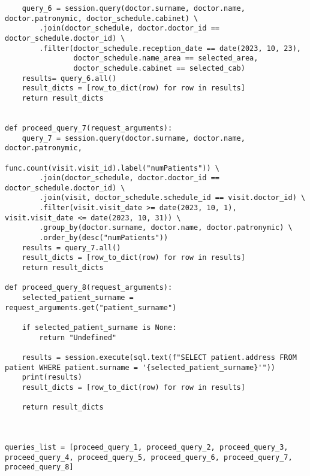 \documentclass{article}
\begin{document}
{\begin{verbatim}
    query_6 = session.query(doctor.surname, doctor.name, doctor.patronymic, doctor_schedule.cabinet) \
        .join(doctor_schedule, doctor.doctor_id == doctor_schedule.doctor_id) \
        .filter(doctor_schedule.reception_date == date(2023, 10, 23),
                doctor_schedule.name_area == selected_area,
                doctor_schedule.cabinet == selected_cab)
    results= query_6.all()
    result_dicts = [row_to_dict(row) for row in results]
    return result_dicts


def proceed_query_7(request_arguments):
    query_7 = session.query(doctor.surname, doctor.name, doctor.patronymic,
                            func.count(visit.visit_id).label("numPatients")) \
        .join(doctor_schedule, doctor.doctor_id == doctor_schedule.doctor_id) \
        .join(visit, doctor_schedule.schedule_id == visit.doctor_id) \
        .filter(visit.visit_date >= date(2023, 10, 1), visit.visit_date <= date(2023, 10, 31)) \
        .group_by(doctor.surname, doctor.name, doctor.patronymic) \
        .order_by(desc("numPatients"))
    results = query_7.all()
    result_dicts = [row_to_dict(row) for row in results]
    return result_dicts

def proceed_query_8(request_arguments):
    selected_patient_surname = request_arguments.get("patient_surname")

    if selected_patient_surname is None:
        return "Undefined"

    results = session.execute(sql.text(f"SELECT patient.address FROM patient WHERE patient.surname = '{selected_patient_surname}'"))
    print(results)
    result_dicts = [row_to_dict(row) for row in results]

    return result_dicts



queries_list = [proceed_query_1, proceed_query_2, proceed_query_3, proceed_query_4, proceed_query_5, proceed_query_6, proceed_query_7, proceed_query_8]
\end{verbatim}
}
\end{document}
